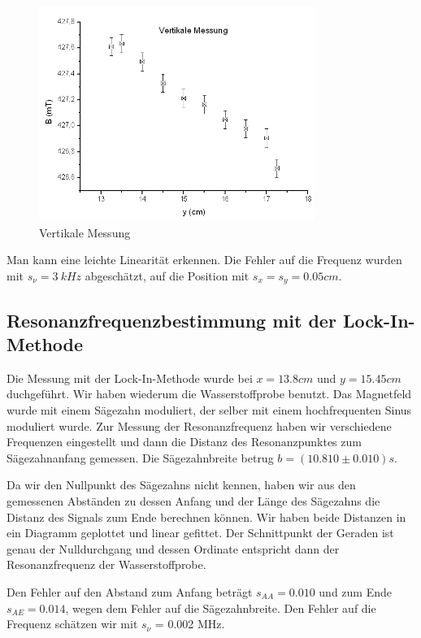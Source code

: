 \begin{figure}[H]
\centering \includegraphics[width=0.8\textwidth]{Bilder/homvert.png}
\caption{Vertikale Messung}
\end{figure}

Man kann eine leichte Linearität erkennen. Die Fehler auf die Frequenz wurden mit $s_\nu=3\ kHz$ abgeschätzt, auf die Position mit $s_x=s_y=0.05cm$.

\subsection{Resonanzfrequenzbestimmung mit der Lock-In-Methode}

Die Messung mit der Lock-In-Methode wurde bei $x=13.8cm$ und $y=15.45cm$ duchgeführt. Wir haben wiederum die Wasserstoffprobe benutzt. Das Magnetfeld wurde mit einem Sägezahn moduliert, der selber mit einem hochfrequenten Sinus moduliert wurde. Zur Messung der Resonanzfrequenz haben wir verschiedene Frequenzen eingestellt und dann die Distanz des Resonanzpunktes zum Sägezahnanfang gemessen. Die Sägezahnbreite betrug $b = (10.810 \pm 0.010)s$. 

Da wir den Nullpunkt des Sägezahns nicht kennen, haben wir aus den gemessenen Abständen zu dessen Anfang und der Länge des Sägezahns die Distanz des Signals zum Ende berechnen können. Wir haben beide Distanzen in ein Diagramm geplottet und linear gefittet. Der Schnittpunkt der Geraden ist genau der Nulldurchgang und dessen Ordinate entspricht dann der Resonanzfrequenz der Wasserstoffprobe.

Den Fehler auf den Abstand zum Anfang beträgt $s_{AA}=0.010$ und zum Ende $s_{AE}=0.014$, wegen dem Fehler auf die Sägezahnbreite. Den Fehler auf die Frequenz schätzen wir mit $s_\nu$ = 0.002 MHz.

